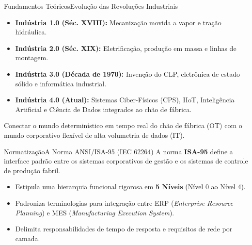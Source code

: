 \begin{senaiframe}{Fundamentos Teóricos}{Evolução das Revoluções Industriais}
  \begin{itemize}
    \item \textbf{Indústria 1.0 (Séc. XVIII):} Mecanização movida a vapor e tração hidráulica.
    \item \textbf{Indústria 2.0 (Séc. XIX):} Eletrificação, produção em massa e linhas de montagem.
    \item \textbf{Indústria 3.0 (Década de 1970):} Invenção do CLP, eletrônica de estado sólido e informática industrial.
    \item \textbf{Indústria 4.0 (Atual):} Sistemas Ciber-Físicos (CPS), IIoT, Inteligência Artificial e Ciência de Dados integrados ao chão de fábrica.
  \end{itemize}

  \vspace{8pt}
  \begin{tcolorbox}[senaibluecard, title={Desafio Atual}]
    Conectar o mundo determinístico em tempo real do chão de fábrica (OT) com o mundo corporativo flexível de alta volumetria de dados (IT).
  \end{tcolorbox}
\end{senaiframe}

\begin{senaiframe}{Normatização}{A Norma ANSI/ISA-95 (IEC 62264)}
  A norma \textbf{ISA-95} define a interface padrão entre os sistemas corporativos de gestão e os sistemas de controle de produção fabril.

  \vspace{6pt}
  \begin{itemize}
    \item Estipula uma hierarquia funcional rigorosa em \textbf{5 Níveis} (Nível 0 ao Nível 4).
    \item Padroniza terminologias para integração entre ERP (\textit{Enterprise Resource Planning}) e MES (\textit{Manufacturing Execution System}).
    \item Delimita responsabilidades de tempo de resposta e requisitos de rede por camada.
  \end{itemize}
\end{senaiframe}

